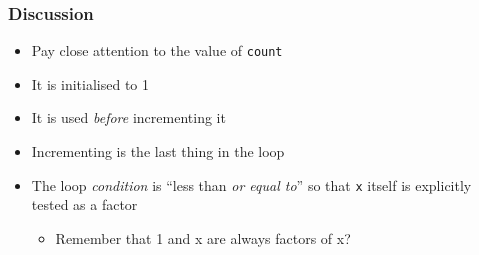 \documentclass[14pt]{beamer}
\begin{document}
\begin{frame}
\frametitle{Discussion}
\begin{itemize}
\item Pay close attention to the value of \texttt{count}
\item It is initialised to 1
\item It is used \textit{before} incrementing it
\item Incrementing is the last thing in the loop
\item The loop \textit{condition} is ``less than \textit{or equal to}'' so that \texttt{x} itself is explicitly tested as a factor
	\begin{itemize}
		\item Remember that 1 and x are always factors of x? 
	\end{itemize}
\end{itemize}
\end{frame}
\end{document}

